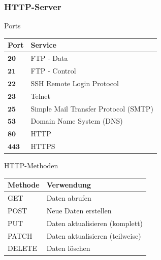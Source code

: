 \subsubsection{HTTP-Server}

\begin{corollary}{Ports}
    \begin{center}
    \begin{tabular}{|l|l|}
    \hline
    Port & Service \\
    \hline
    $\mathbf{20}$ & FTP - Data \\
    \hline
    $\mathbf{21}$ & FTP - Control \\
    \hline
    $\mathbf{22}$ & SSH Remote Login Protocol \\
    \hline
    $\mathbf{23}$ & Telnet \\
    \hline
    $\mathbf{25}$ & Simple Mail Transfer Protocol (SMTP) \\
    \hline
    $\mathbf{53}$ & Domain Name System (DNS) \\
    \hline
    $\mathbf{80}$ & HTTP \\
    \hline
    $\mathbf{443}$ & HTTPS \\
    \hline
    \end{tabular}
    \end{center}
\end{corollary}

\begin{theorem}{HTTP-Methoden}
    \begin{center}
    \begin{tabular}{|l|l|}
    \hline
    Methode & Verwendung \\
    \hline
    GET & Daten abrufen \\
    \hline
    POST & Neue Daten erstellen \\
    \hline
    PUT & Daten aktualisieren (komplett) \\
    \hline
    PATCH & Daten aktualisieren (teilweise) \\
    \hline
    DELETE & Daten löschen \\
    \hline
    \end{tabular}
    \end{center}
\end{theorem}

